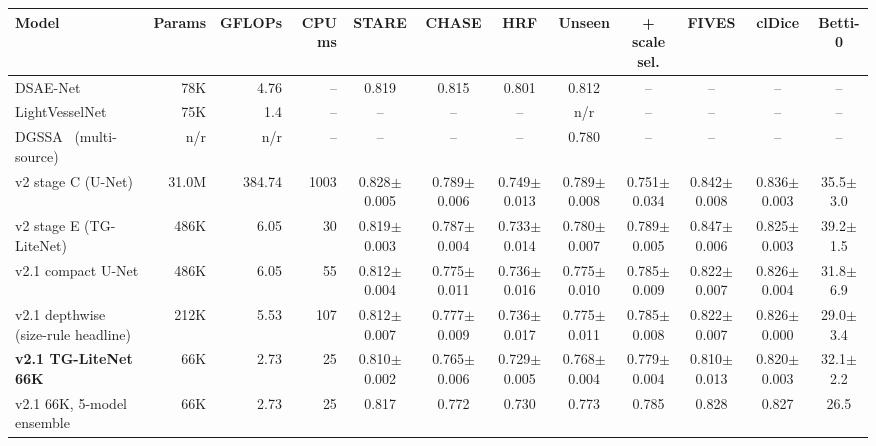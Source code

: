 \begin{tabular}{l rrr ccc cc c cc}
\toprule
Model & Params & GFLOPs & CPU ms & STARE & CHASE & HRF & Unseen & + scale sel. & FIVES & clDice & Betti-0 \\
\midrule
DSAE-Net~\cite{zeng2025} & 78K & 4.76 & -- & 0.819 & 0.815 & 0.801 & 0.812 & -- & -- & -- & -- \\
LightVesselNet~\cite{sobhan2026} & 75K & 1.4 & -- & -- & -- & -- & n/r & -- & -- & -- & -- \\
DGSSA~\cite{liu2026dgssa} (multi-source) & n/r & n/r & -- & -- & -- & -- & 0.780 & -- & -- & -- & -- \\
\midrule
v2 stage C (U-Net) & 31.0M & 384.74 & 1003 & 0.828{\scriptsize$\pm$0.005} & 0.789{\scriptsize$\pm$0.006} & 0.749{\scriptsize$\pm$0.013} & 0.789{\scriptsize$\pm$0.008} & 0.751{\scriptsize$\pm$0.034} & 0.842{\scriptsize$\pm$0.008} & 0.836{\scriptsize$\pm$0.003} & 35.5{\scriptsize$\pm$3.0} \\
\midrule
v2 stage E (TG-LiteNet) & 486K & 6.05 & 30 & 0.819{\scriptsize$\pm$0.003} & 0.787{\scriptsize$\pm$0.004} & 0.733{\scriptsize$\pm$0.014} & 0.780{\scriptsize$\pm$0.007} & 0.789{\scriptsize$\pm$0.005} & 0.847{\scriptsize$\pm$0.006} & 0.825{\scriptsize$\pm$0.003} & 39.2{\scriptsize$\pm$1.5} \\
v2.1 compact U-Net & 486K & 6.05 & 55 & 0.812{\scriptsize$\pm$0.004} & 0.775{\scriptsize$\pm$0.011} & 0.736{\scriptsize$\pm$0.016} & 0.775{\scriptsize$\pm$0.010} & 0.785{\scriptsize$\pm$0.009} & 0.822{\scriptsize$\pm$0.007} & 0.826{\scriptsize$\pm$0.004} & 31.8{\scriptsize$\pm$6.9} \\
v2.1 depthwise (size-rule headline) & 212K & 5.53 & 107 & 0.812{\scriptsize$\pm$0.007} & 0.777{\scriptsize$\pm$0.009} & 0.736{\scriptsize$\pm$0.017} & 0.775{\scriptsize$\pm$0.011} & 0.785{\scriptsize$\pm$0.008} & 0.822{\scriptsize$\pm$0.007} & 0.826{\scriptsize$\pm$0.000} & 29.0{\scriptsize$\pm$3.4} \\
\textbf{v2.1 TG-LiteNet 66K} & 66K & 2.73 & 25 & 0.810{\scriptsize$\pm$0.002} & 0.765{\scriptsize$\pm$0.006} & 0.729{\scriptsize$\pm$0.005} & 0.768{\scriptsize$\pm$0.004} & 0.779{\scriptsize$\pm$0.004} & 0.810{\scriptsize$\pm$0.013} & 0.820{\scriptsize$\pm$0.003} & 32.1{\scriptsize$\pm$2.2} \\
v2.1 66K, 5-model ensemble & 66K & 2.73 & 25 & 0.817 & 0.772 & 0.730 & 0.773 & 0.785 & 0.828 & 0.827 & 26.5 \\
\bottomrule
\end{tabular}